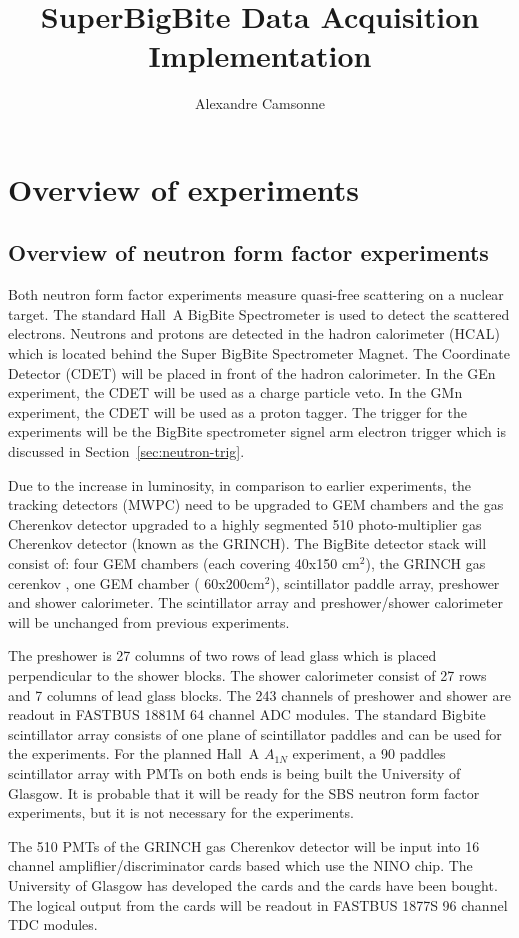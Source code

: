 \documentclass{article}
\title {SuperBigBite Data Acquisition Implementation}
\author{Alexandre Camsonne}
\begin{document}
\section{ Overview of experiments}
\subsection{Overview of neutron form factor experiments}
Both neutron form factor experiments measure quasi-free scattering on a nuclear target. The standard Hall~A
BigBite Spectrometer is used to detect the scattered electrons.  
Neutrons and protons are detected in
the hadron calorimeter (HCAL) which is located behind the Super BigBite Spectrometer Magnet. 
The Coordinate Detector (CDET) will be placed in front of the hadron calorimeter.
In the GEn experiment, the CDET will be used as a charge particle veto. In the GMn experiment,
the CDET will be used as a proton tagger. The trigger for the experiments will be the BigBite spectrometer 
signel arm electron trigger which is discussed in Section~\ref{sec:neutron-trig}.


Due to the increase in
luminosity, in comparison to earlier experiments, the tracking detectors (MWPC) need to be upgraded to
GEM chambers and the gas Cherenkov detector upgraded to a highly segmented 510 photo-multiplier gas
Cherenkov detector (known as the GRINCH).   The BigBite detector stack will consist of:
four GEM chambers (each covering 40x150 cm$^2$), the GRINCH gas cerenkov , one GEM chamber ( 60x200cm$^2$), 
scintillator paddle array, preshower and shower calorimeter. The scintillator array and preshower/shower
calorimeter will be unchanged from previous experiments. 

The preshower is 27 columns of two rows of lead glass which is placed perpendicular to the shower blocks.
The shower calorimeter consist of 27 rows and 7 columns of lead glass blocks. The 243 channels of
preshower and shower are readout in FASTBUS 1881M 64 channel ADC modules. The standard Bigbite 
scintillator array consists of one plane of scintillator paddles and can be used for the experiments. 
For the planned Hall~A $A_{1N}$ experiment, a 90  paddles scintillator array with
PMTs on both ends is being built the University of Glasgow. It is probable that it will
be ready for the SBS neutron form factor experiments, but it is not necessary for the experiments.

The 510 PMTs of the GRINCH gas Cherenkov detector will be input into 16 channel ampliflier/discriminator
cards based which use the NINO chip. The University of Glasgow has developed the cards and the cards have 
been bought. The logical output from the cards will be readout in FASTBUS 1877S 96 channel TDC modules.
\end{document}
